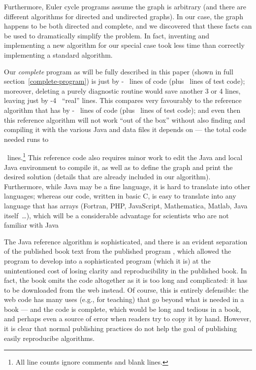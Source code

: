 \documentclass[12pt]{article}
\begin{document}
Furthermore, Euler cycle programs assume the graph is arbitrary (and there are different algorithms for directed and undirected graphs). In our case, the graph happens to be both directed and complete, and we discovered that these facts can be used to dramatically simplify the problem. In fact, inventing and implementing a new algorithm for our special case took less time than correctly implementing a standard algorithm. 

Our \emph{complete\/} program as will be fully described in this paper (shown in full section~\ref{complete-program}) is just 
\newcount\testcode 
{} \advance\linesofcode by -\testcode
\the\linesofcode\ lines of code  (plus \the\testcode\ lines of test code); moreover, deleting a purely diagnostic routine would save another 3 or 4 lines, leaving just
\advance \linesofcode by -4 \the\linesofcode\ ``real'' lines. This compares very favourably to the reference algorithm \cite{sedgewickcode} that has 
 \advance\linesofcode by -\testcode
\the\linesofcode\ lines of code (plus \the\testcode\ lines of test code); and even then this reference algorithm will not work ``out of the box'' without also finding  and compiling it  with the various Java and data files it depends on --- the total code needed runs to   

\the\linesofcode\ lines.\footnote{All line counts ignore comments and blank lines.} This reference code also requires minor work to edit the Java and local Java environment to compile it, as well as to define the graph and print the desired solution (details that are already included in our algorithm). Furthermore, while Java may be a fine language, it is hard to translate into other languages; whereas our code, written in basic C, is easy to translate into any language that has arrays (Fortran, PHP, JavaScript, Mathematica, Matlab, Java itself~\ldots), which will be a considerable advantage for scientists who are not familiar with Java

The Java reference algorithm is sophisticated, and there is an evident separation of the published book text \cite{sedgewickbook} from the published program \cite{sedgewickcode}, which allowed the program to develop into a sophisticated program (which it is) at the unintentioned cost of losing clarity and reproducibility in the published book. In fact, the book \cite{sedgewickcode} omits the code altogether as it is too long and complicated: it has to be downloaded from the web instead. Of course, this is entirely defensible: the web code has many uses (e.g., for teaching) that go beyond what is needed in a book --- and the code is complete, which would be long and tedious in a book, and perhaps even a source of error when readers try to copy it by hand. However, it is clear that normal publishing practices do not help the goal of publishing easily reproducibe algorithms.
\end{document}

